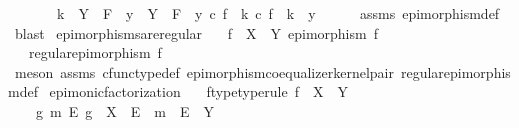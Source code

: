 \begin{isabellebody}
\ \ \ \ \ \ \ k\ {\isacharcolon}{\kern0pt}\ Y\ {\isasymrightarrow}\ F\ {\isasymLongrightarrow}\ y\ {\isacharcolon}{\kern0pt}\ Y\ {\isasymrightarrow}\ F\ {\isasymLongrightarrow}\ y\ {\isasymcirc}\isactrlsub c\ f\ {\isacharequal}{\kern0pt}\ k\ {\isasymcirc}\isactrlsub c\ f\ {\isasymLongrightarrow}\ k\ {\isacharequal}{\kern0pt}\ y{\isachardoublequoteclose}\isanewline
\ \ \ \ \isamarkupfalse%
\ assms\ epimorphism{\isacharunderscore}{\kern0pt}def{}\ \isamarkupfalse%
\ blast\isanewline
{}\isamarkupfalse%
%
\endisatagproof
{\isafoldproof}%
%
\isadelimproof
\isanewline
%
\endisadelimproof
\isanewline
{}\isamarkupfalse%
\ epimorphisms{\isacharunderscore}{\kern0pt}are{\isacharunderscore}{\kern0pt}regular{\isacharcolon}{\kern0pt}\isanewline
\ \ \ {\isachardoublequoteopen}f\ {\isacharcolon}{\kern0pt}\ X\ {\isasymrightarrow}\ Y{\isachardoublequoteclose}\ {\isachardoublequoteopen}epimorphism\ f{\isachardoublequoteclose}\isanewline
\ \ \ {\isachardoublequoteopen}regular{\isacharunderscore}{\kern0pt}epimorphism\ f{\isachardoublequoteclose}\isanewline
%
\isadelimproof
\ \ %
\endisadelimproof
%
\isatagproof
{}\isamarkupfalse%
\ {\isacharparenleft}{\kern0pt}meson\ assms{\isacharparenleft}{\kern0pt}{}{\isacharparenright}{\kern0pt}\ cfunc{\isacharunderscore}{\kern0pt}type{\isacharunderscore}{\kern0pt}def\ epimorphism{\isacharunderscore}{\kern0pt}coequalizer{\isacharunderscore}{\kern0pt}kernel{\isacharunderscore}{\kern0pt}pair\ regular{\isacharunderscore}{\kern0pt}epimorphism{\isacharunderscore}{\kern0pt}def{\isacharparenright}{\kern0pt}%
\endisatagproof
{\isafoldproof}%
%
\isadelimproof
%
\endisadelimproof
%
\isadelimdocument
%
\endisadelimdocument
%
\isatagdocument
%
\isamarkuptrue%
%
\endisatagdocument
{\isafolddocument}%
%
\isadelimdocument
%
\endisadelimdocument
{}\isamarkupfalse%
\ epi{\isacharunderscore}{\kern0pt}monic{\isacharunderscore}{\kern0pt}factorization{\isacharcolon}{\kern0pt}\isanewline
\ \ \ f{\isacharunderscore}{\kern0pt}type{\isacharbrackleft}{\kern0pt}type{\isacharunderscore}{\kern0pt}rule{\isacharbrackright}{\kern0pt}{\isacharcolon}{\kern0pt}\ {\isachardoublequoteopen}f\ {\isacharcolon}{\kern0pt}\ X\ {\isasymrightarrow}\ Y{\isachardoublequoteclose}\isanewline
\ \ \ {\isachardoublequoteopen}{\isasymexists}\ g\ m\ E{\isachardot}{\kern0pt}\ g\ {\isacharcolon}{\kern0pt}\ X\ {\isasymrightarrow}\ E\ {\isasymand}\ m\ {\isacharcolon}{\kern0pt}\ E\ {\isasymrightarrow}\ Y\ \isanewline

\end{isabellebody}
